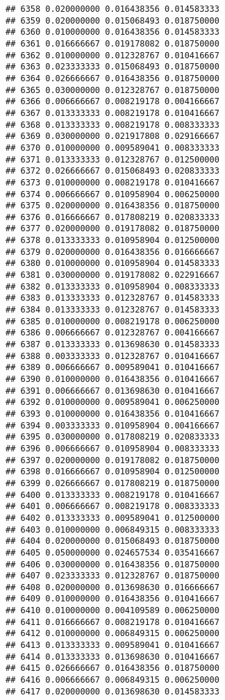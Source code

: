 \documentclass[
]{article}
\begin{document}
\begin{verbatim}
## 6358 0.020000000 0.016438356 0.014583333
## 6359 0.020000000 0.015068493 0.018750000
## 6360 0.010000000 0.016438356 0.014583333
## 6361 0.016666667 0.019178082 0.018750000
## 6362 0.010000000 0.012328767 0.010416667
## 6363 0.023333333 0.015068493 0.018750000
## 6364 0.026666667 0.016438356 0.018750000
## 6365 0.030000000 0.012328767 0.018750000
## 6366 0.006666667 0.008219178 0.004166667
## 6367 0.013333333 0.008219178 0.010416667
## 6368 0.013333333 0.008219178 0.008333333
## 6369 0.030000000 0.021917808 0.029166667
## 6370 0.010000000 0.009589041 0.008333333
## 6371 0.013333333 0.012328767 0.012500000
## 6372 0.026666667 0.015068493 0.020833333
## 6373 0.010000000 0.008219178 0.010416667
## 6374 0.006666667 0.010958904 0.006250000
## 6375 0.020000000 0.016438356 0.018750000
## 6376 0.016666667 0.017808219 0.020833333
## 6377 0.020000000 0.019178082 0.018750000
## 6378 0.013333333 0.010958904 0.012500000
## 6379 0.020000000 0.016438356 0.016666667
## 6380 0.010000000 0.010958904 0.014583333
## 6381 0.030000000 0.019178082 0.022916667
## 6382 0.013333333 0.010958904 0.008333333
## 6383 0.013333333 0.012328767 0.014583333
## 6384 0.013333333 0.012328767 0.014583333
## 6385 0.010000000 0.008219178 0.006250000
## 6386 0.006666667 0.012328767 0.004166667
## 6387 0.013333333 0.013698630 0.014583333
## 6388 0.003333333 0.012328767 0.010416667
## 6389 0.006666667 0.009589041 0.010416667
## 6390 0.010000000 0.016438356 0.010416667
## 6391 0.006666667 0.013698630 0.010416667
## 6392 0.010000000 0.009589041 0.006250000
## 6393 0.010000000 0.016438356 0.010416667
## 6394 0.003333333 0.010958904 0.004166667
## 6395 0.030000000 0.017808219 0.020833333
## 6396 0.006666667 0.010958904 0.008333333
## 6397 0.020000000 0.019178082 0.018750000
## 6398 0.016666667 0.010958904 0.012500000
## 6399 0.026666667 0.017808219 0.018750000
## 6400 0.013333333 0.008219178 0.010416667
## 6401 0.006666667 0.008219178 0.008333333
## 6402 0.013333333 0.009589041 0.012500000
## 6403 0.010000000 0.006849315 0.008333333
## 6404 0.020000000 0.015068493 0.018750000
## 6405 0.050000000 0.024657534 0.035416667
## 6406 0.030000000 0.016438356 0.018750000
## 6407 0.023333333 0.012328767 0.018750000
## 6408 0.020000000 0.013698630 0.016666667
## 6409 0.010000000 0.016438356 0.010416667
## 6410 0.010000000 0.004109589 0.006250000
## 6411 0.016666667 0.008219178 0.010416667
## 6412 0.010000000 0.006849315 0.006250000
## 6413 0.013333333 0.009589041 0.010416667
## 6414 0.013333333 0.013698630 0.010416667
## 6415 0.026666667 0.016438356 0.018750000
## 6416 0.006666667 0.006849315 0.006250000
## 6417 0.020000000 0.013698630 0.014583333

\end{verbatim}
\end{document}
